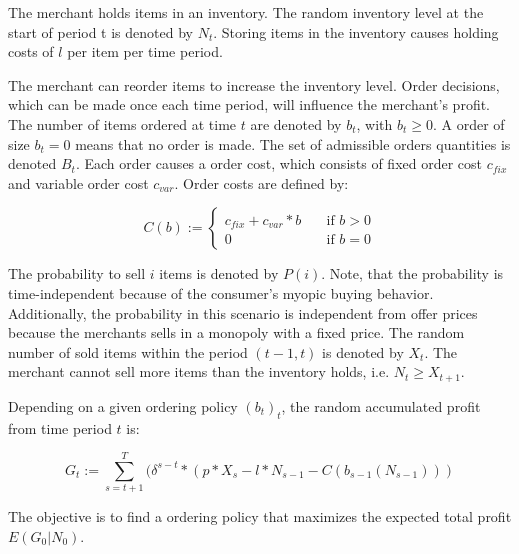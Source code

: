 The merchant holds items in an inventory.
The random inventory level at the start of period t is denoted by $N_t$.
Storing items in the inventory causes holding costs of $l$ per item per time period. %

The merchant can reorder items to increase the inventory level.
Order decisions, which can be made once each time period, will influence the merchant's profit.
The number of items ordered at time $t$ are denoted by $b_t$, with $b_t \geq 0$.
A order of size $b_t = 0$ means that no order is made.
The set of admissible orders quantities is denoted $B_t$.
Each order causes a order cost, which consists of fixed order cost $c_{fix}$ and variable order cost $c_{var}$.
Order costs are defined by:

$$
C(b) := \begin{cases}
c_{fix} + c_{var} * b  & \quad \text{if } b > 0 \\
0  & \quad \text{if } b = 0
\end{cases}
$$

The probability to sell $i$ items is denoted by $P(i)$.
Note, that the probability is time-independent because of the consumer's myopic buying behavior.
Additionally, the probability in this scenario is independent from offer prices because the merchants sells in a monopoly with a fixed price.
The random number of sold items within the period $(t-1, t)$ is denoted by $X_t$.
The merchant cannot sell more items than the inventory holds, i.e. $N_t \geq X_{t+1}$.

Depending on a given ordering policy $(b_t)_t$, the random accumulated profit from time period $t$ is:

$$
G_t := \sum_{s=t+1}^{T} (\delta^{s-t} * (p * X_s - l * N_{s-1} - C(b_{s-1}(N_{s-1})))
$$

The objective is to find a ordering policy that maximizes the expected total profit $E(G_0 | N_0)$.


